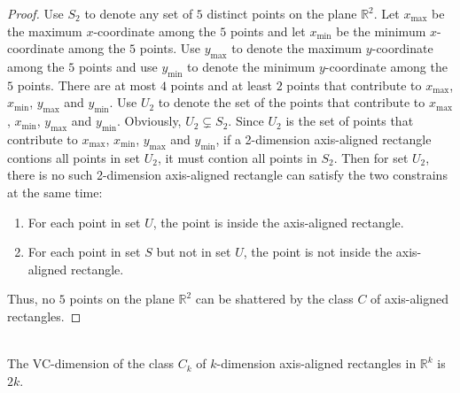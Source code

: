 \begin{proof}
    Use $S_2$ to denote any set of $5$ distinct points on the plane $\mathbb{R}^2$. 
    Let $x_{\max}$ be the maximum $x$-coordinate among the $5$ points and 
    let $x_{\min}$ be the minimum $x$-coordinate among the $5$ points.
    Use $y_{\max}$ to denote the maximum $y$-coordinate among the $5$ points and
    use $y_{\min}$ to denote the minimum $y$-coordinate among the $5$ points.
    There are at most $4$ points and at least $2$ points that contribute to  $x_{\max}$, $x_{\min}$, $y_{\max}$ and $y_{\min}$.
    Use $U_2$ to denote the set of the points that contribute to  $x_{\max}$, $x_{\min}$, $y_{\max}$ and $y_{\min}$.
    Obviously, $U_2\subsetneq S_2$. 
    Since $U_2$ is the set of points that contribute to  $x_{\max}$, $x_{\min}$, $y_{\max}$ and $y_{\min}$,
    if a 2-dimension axis-aligned rectangle contions all points in set $U_2$, it must contion all points in $S_2$.
    Then for set $U_2$, there is no such 2-dimension axis-aligned rectangle can satisfy the two constrains at the same time:
    \begin{enumerate}
        \item For each point in set $U$, the point is inside the axis-aligned rectangle.
        \item  For each point in set $S$ but not in set $U$, the point is not inside the axis-aligned rectangle.
    \end{enumerate}

    Thus, no $5$ points on the plane $\mathbb{R}^2$ can be shattered by the class $C$ of axis-aligned
    rectangles.
\end{proof}
\noindent {}\\
The VC-dimension of the class $C_k$ of $k$-dimension axis-aligned rectangles in $\mathbb{R}^k$ is $2k$.
